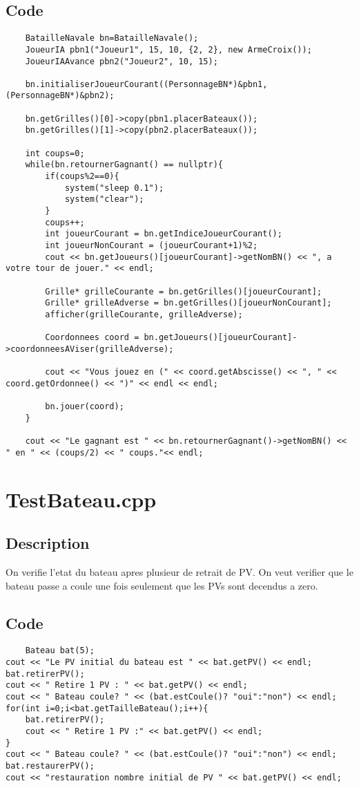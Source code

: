         \subsection{Code}
\begin{lstlisting}
	BatailleNavale bn=BatailleNavale();
    JoueurIA pbn1("Joueur1", 15, 10, {2, 2}, new ArmeCroix());
    JoueurIAAvance pbn2("Joueur2", 10, 15);

    bn.initialiserJoueurCourant((PersonnageBN*)&pbn1,(PersonnageBN*)&pbn2);

    bn.getGrilles()[0]->copy(pbn1.placerBateaux());
    bn.getGrilles()[1]->copy(pbn2.placerBateaux());

    int coups=0;
    while(bn.retournerGagnant() == nullptr){
        if(coups%2==0){
            system("sleep 0.1");
            system("clear");
        }
        coups++;
        int joueurCourant = bn.getIndiceJoueurCourant();
        int joueurNonCourant = (joueurCourant+1)%2;
        cout << bn.getJoueurs()[joueurCourant]->getNomBN() << ", a votre tour de jouer." << endl;

        Grille* grilleCourante = bn.getGrilles()[joueurCourant];
        Grille* grilleAdverse = bn.getGrilles()[joueurNonCourant];
        afficher(grilleCourante, grilleAdverse);

        Coordonnees coord = bn.getJoueurs()[joueurCourant]->coordonneesAViser(grilleAdverse);

        cout << "Vous jouez en (" << coord.getAbscisse() << ", " << coord.getOrdonnee() << ")" << endl << endl;

        bn.jouer(coord);
    }

    cout << "Le gagnant est " << bn.retournerGagnant()->getNomBN() << " en " << (coups/2) << " coups."<< endl;
	\end{lstlisting}
    \section{TestBateau.cpp}
        \subsection{Description}
            On verifie l'etat du bateau apres plusieur de retrait de PV. On veut verifier que le bateau passe a coule une fois seulement que les PVs sont decendus a zero.
        \subsection{Code}
\begin{lstlisting}
	Bateau bat(5);
cout << "Le PV initial du bateau est " << bat.getPV() << endl;
bat.retirerPV();
cout << " Retire 1 PV : " << bat.getPV() << endl;
cout << " Bateau coule? " << (bat.estCoule()? "oui":"non") << endl;
for(int i=0;i<bat.getTailleBateau();i++){
	bat.retirerPV();
	cout << " Retire 1 PV :" << bat.getPV() << endl;
}
cout << " Bateau coule? " << (bat.estCoule()? "oui":"non") << endl;
bat.restaurerPV();
cout << "restauration nombre initial de PV " << bat.getPV() << endl;
	\end{lstlisting}
